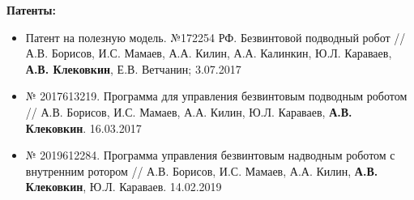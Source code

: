 \begin{frame}[shrink=25]
\begin{itemize}
\end{itemize}

\textbf{Патенты:}
\begin{itemize}
		
	\item Патент на полезную модель. №172254 РФ. Безвинтовой подводный робот //  А.В. Борисов, И.С. Мамаев, А.А. Килин, А.А. Калинкин, Ю.Л. Караваев, \textbf{А.В. Клековкин}, Е.В. Ветчанин; %
	3.07.2017
		
	\item № 2017613219. Программа для управления безвинтовым подводным роботом // А.В. Борисов, И.С. Мамаев, А.А. Килин, Ю.Л. Караваев, \textbf{А.В. Клековкин}. %
	16.03.2017
		
	\item № 2019612284. Программа управления безвинтовым надводным роботом с внутренним ротором // А.В. Борисов, И.С. Мамаев, А.А. Килин, \textbf{А.В. Клековкин}, Ю.Л. Караваев. %
	14.02.2019
\end{itemize}

\end{frame}

